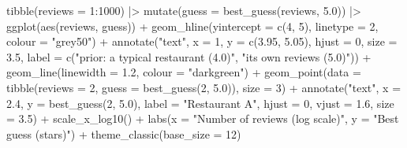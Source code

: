 \documentclass[
  letterpaper,
  DIV=11,
  numbers=noendperiod]{scrartcl}
\newenvironment{Shaded}{\begin{snugshade}}{\end{snugshade}}
\newcommand{\AttributeTok}[1]{\textcolor[rgb]{0.40,0.45,0.13}{#1}}
\newcommand{\DecValTok}[1]{\textcolor[rgb]{0.68,0.00,0.00}{#1}}
\newcommand{\FloatTok}[1]{\textcolor[rgb]{0.68,0.00,0.00}{#1}}
\newcommand{\FunctionTok}[1]{\textcolor[rgb]{0.28,0.35,0.67}{#1}}
\newcommand{\NormalTok}[1]{\textcolor[rgb]{0.00,0.23,0.31}{#1}}
\newcommand{\SpecialCharTok}[1]{\textcolor[rgb]{0.37,0.37,0.37}{#1}}
\newcommand{\StringTok}[1]{\textcolor[rgb]{0.13,0.47,0.30}{#1}}
\begin{document}
\begin{Shaded}
\begin{Highlighting}[]
\FunctionTok{tibble}\NormalTok{(}\AttributeTok{reviews =} \DecValTok{1}\SpecialCharTok{:}\DecValTok{1000}\NormalTok{) }\SpecialCharTok{|\textgreater{}}
  \FunctionTok{mutate}\NormalTok{(}\AttributeTok{guess =} \FunctionTok{best\_guess}\NormalTok{(reviews, }\FloatTok{5.0}\NormalTok{)) }\SpecialCharTok{|\textgreater{}}
  \FunctionTok{ggplot}\NormalTok{(}\FunctionTok{aes}\NormalTok{(reviews, guess)) }\SpecialCharTok{+}
  \FunctionTok{geom\_hline}\NormalTok{(}\AttributeTok{yintercept =} \FunctionTok{c}\NormalTok{(}\DecValTok{4}\NormalTok{, }\DecValTok{5}\NormalTok{), }\AttributeTok{linetype =} \DecValTok{2}\NormalTok{, }\AttributeTok{colour =} \StringTok{"grey50"}\NormalTok{) }\SpecialCharTok{+}
  \FunctionTok{annotate}\NormalTok{(}\StringTok{"text"}\NormalTok{, }\AttributeTok{x =} \DecValTok{1}\NormalTok{, }\AttributeTok{y =} \FunctionTok{c}\NormalTok{(}\FloatTok{3.95}\NormalTok{, }\FloatTok{5.05}\NormalTok{), }\AttributeTok{hjust =} \DecValTok{0}\NormalTok{, }\AttributeTok{size =} \FloatTok{3.5}\NormalTok{,}
           \AttributeTok{label =} \FunctionTok{c}\NormalTok{(}\StringTok{"prior: a typical restaurant (4.0)"}\NormalTok{, }\StringTok{"its own reviews (5.0)"}\NormalTok{)) }\SpecialCharTok{+}
  \FunctionTok{geom\_line}\NormalTok{(}\AttributeTok{linewidth =} \FloatTok{1.2}\NormalTok{, }\AttributeTok{colour =} \StringTok{"darkgreen"}\NormalTok{) }\SpecialCharTok{+}
  \FunctionTok{geom\_point}\NormalTok{(}\AttributeTok{data =} \FunctionTok{tibble}\NormalTok{(}\AttributeTok{reviews =} \DecValTok{2}\NormalTok{, }\AttributeTok{guess =} \FunctionTok{best\_guess}\NormalTok{(}\DecValTok{2}\NormalTok{, }\FloatTok{5.0}\NormalTok{)), }\AttributeTok{size =} \DecValTok{3}\NormalTok{) }\SpecialCharTok{+}
  \FunctionTok{annotate}\NormalTok{(}\StringTok{"text"}\NormalTok{, }\AttributeTok{x =} \FloatTok{2.4}\NormalTok{, }\AttributeTok{y =} \FunctionTok{best\_guess}\NormalTok{(}\DecValTok{2}\NormalTok{, }\FloatTok{5.0}\NormalTok{), }\AttributeTok{label =} \StringTok{"Restaurant A"}\NormalTok{,}
           \AttributeTok{hjust =} \DecValTok{0}\NormalTok{, }\AttributeTok{vjust =} \FloatTok{1.6}\NormalTok{, }\AttributeTok{size =} \FloatTok{3.5}\NormalTok{) }\SpecialCharTok{+}
  \FunctionTok{scale\_x\_log10}\NormalTok{() }\SpecialCharTok{+}
  \FunctionTok{labs}\NormalTok{(}\AttributeTok{x =} \StringTok{"Number of reviews (log scale)"}\NormalTok{, }\AttributeTok{y =} \StringTok{"Best guess (stars)"}\NormalTok{) }\SpecialCharTok{+}
  \FunctionTok{theme\_classic}\NormalTok{(}\AttributeTok{base\_size =} \DecValTok{12}\NormalTok{)}
\end{Highlighting}
\end{Shaded}
\end{document}
